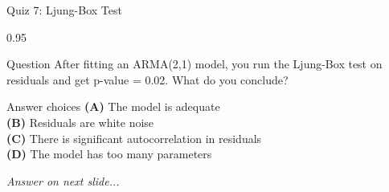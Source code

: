\documentclass[9pt, aspectratio=169, t]{beamer}
\begin{document}
\begin{frame}{Quiz 7: Ljung-Box Test}
    \begin{cminipage}{0.95\textwidth}
    \begin{alertblock}{Question}
        After fitting an ARMA(2,1) model, you run the Ljung-Box test on residuals and get p-value = 0.02. What do you conclude?
    \end{alertblock}

    \vspace{0.4cm}

    \begin{block}{Answer choices}
        \textcolor{MainBlue}{\textbf{(A)}} The model is adequate\\[3pt]
        \textcolor{MainBlue}{\textbf{(B)}} Residuals are white noise\\[3pt]
        \textcolor{MainBlue}{\textbf{(C)}} There is significant autocorrelation in residuals\\[3pt]
        \textcolor{MainBlue}{\textbf{(D)}} The model has too many parameters
    \end{block}

    \vspace{0.5cm}

    \begin{center}
        \textit{Answer on next slide...}
    \end{center}
    \end{cminipage}
\end{frame}
\end{document}
